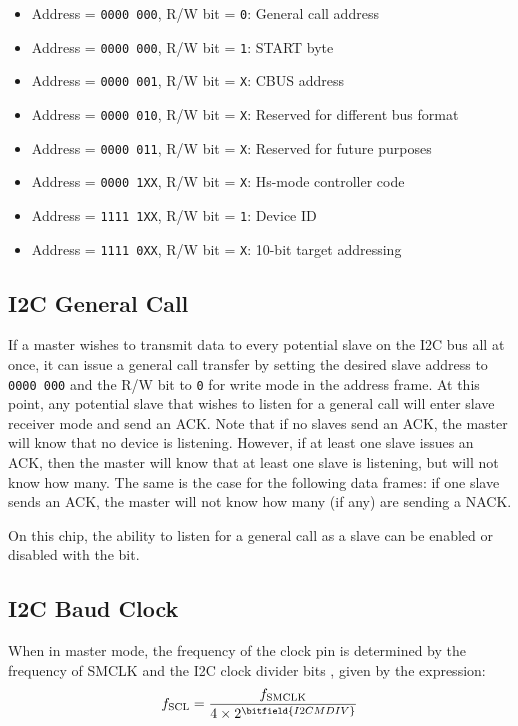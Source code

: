 \begin{itemize}
	\item Address = \texttt{0000 000}, R/W bit = \texttt{0}: General call address
	\item Address = \texttt{0000 000}, R/W bit = \texttt{1}: START byte
	\item Address = \texttt{0000 001}, R/W bit = \texttt{X}: CBUS address
	\item Address = \texttt{0000 010}, R/W bit = \texttt{X}: Reserved for different bus format
	\item Address = \texttt{0000 011}, R/W bit = \texttt{X}: Reserved for future purposes
	\item Address = \texttt{0000 1XX}, R/W bit = \texttt{X}: Hs-mode controller code
	\item Address = \texttt{1111 1XX}, R/W bit = \texttt{1}: Device ID
	\item Address = \texttt{1111 0XX}, R/W bit = \texttt{X}: 10-bit target addressing
\end{itemize}



\subsection{I2C General Call}

If a master wishes to transmit data to every potential slave on the I2C bus all at once, it can issue a general call transfer by setting the desired slave address to \texttt{0000 000} and the R/W bit to \texttt{0} for write mode in the address frame. At this point, any potential slave that wishes to listen for a general call will enter slave receiver mode and send an ACK. Note that if no slaves send an ACK, the master will know that no device is listening. However, if at least one slave issues an ACK, then the master will know that at least one slave is listening, but will not know how many. The same is the case for the following data frames: if one slave sends an ACK, the master will not know how many (if any) are sending a NACK.

On this chip, the ability to listen for a general call as a slave can be enabled or disabled with the  bit.



\subsection{I2C Baud Clock}

When in master mode, the frequency of the  clock pin is determined by the frequency of SMCLK and the I2C clock divider bits , given by the expression:
\begin{equation*}
f_\textrm{SCL} = \frac{f_\textrm{SMCLK}}{4 \times 2^\bitfield{I2CMDIV}}
\end{equation*}



